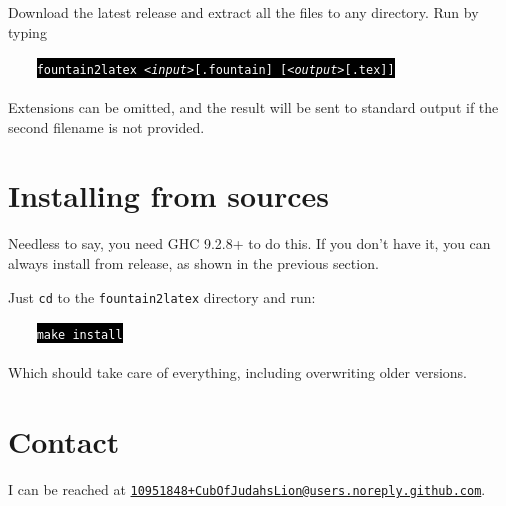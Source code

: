 \documentclass[11pt]{article}
\newcommand{\link}[2]{\textcolor{Blue}{\href{#1}{#2}}}
\begin{document}
Download the latest release and extract all the files to any directory.
Run by typing\\
\\
\verb|    |\colorbox{Black}{\textcolor{White}{\texttt{fountain2latex \emph{<input>}[.fountain] [\emph{<output>}[.tex]]}}}\\
\\
Extensions can be omitted, and the result will be sent to standard
output if the second filename is not provided.


\section*{Installing from sources}

Needless to say, you need GHC 9.2.8+ to do this. If you don't have it,
you can always install from release, as shown in the previous section.

Just \texttt{cd} to the \texttt{fountain2latex} directory and run:\\
\\
\verb|    |\colorbox{Black}{\textcolor{White}{\texttt{make install}}}\\
\\
Which should take care of everything, including overwriting older
versions.


\section*{Contact}

I can be reached at \texttt{\link{mailto:10951848+CubOfJudahsLion@users.noreply.github.com}{10951848+CubOfJudahsLion@users.noreply.github.com}}.\\
\\
\end{document}
